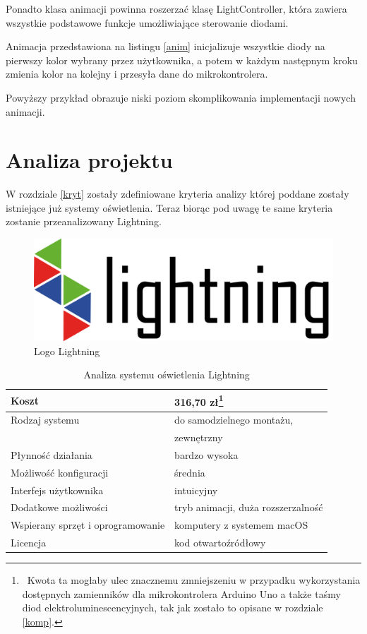 \documentclass[12pt]{report}
\begin{document}
Ponadto klasa animacji powinna roszerzać klasę LightController, która zawiera wszystkie podstawowe funkcje umożliwiające sterowanie diodami.

Animacja przedstawiona na listingu \ref{anim} inicjalizuje wszystkie diody na pierwszy kolor wybrany przez użytkownika, a potem w każdym następnym kroku zmienia kolor na kolejny i przesyła dane do mikrokontrolera.

 \label{anims}

Powyższy przykład obrazuje niski poziom skomplikowania implementacji nowych animacji.

\section{Analiza projektu}

W rozdziale \ref{kryt} zostały zdefiniowane kryteria analizy której poddane zostały istnie\-jące już systemy oświetlenia. Teraz biorąc pod uwagę te same kryteria zostanie przeanalizowany Lightning.

\begin{figure}[h]
\centering
\includegraphics[width=\textwidth]{../resources/logo.png}
\caption{Logo Lightning}
\end{figure}

\begin{table}[h]
\centering
\begin{tabular}{| l | l |} 
\hline 
Koszt & 316,70 zł\footnote{~Kwota ta mogłaby ulec znacznemu zmniejszeniu w przypadku wykorzystania dostępnych zamienników dla mikrokontrolera Arduino Uno a także taśmy diod elektroluminescencyjnych, tak jak zostało to opisane w rozdziale \ref{komp}.}\\ \hline
Rodzaj systemu & do samodzielnego montażu, \\ \hline
& zewnętrzny \\ \hline
Płynność działania & bardzo wysoka \\ \hline
Możliwość konfiguracji & średnia  \\ \hline
Interfejs użytkownika & intuicyjny  \\ \hline
Dodatkowe możliwości &  tryb animacji, duża rozszerzalność \\ \hline
Wspierany sprzęt i oprogramowanie &  komputery z systemem macOS  \\ \hline
Licencja & kod otwartoźródłowy  \\ \hline
\end{tabular} 
\caption{Analiza systemu oświetlenia Lightning}
\end{table}
\end{document}
